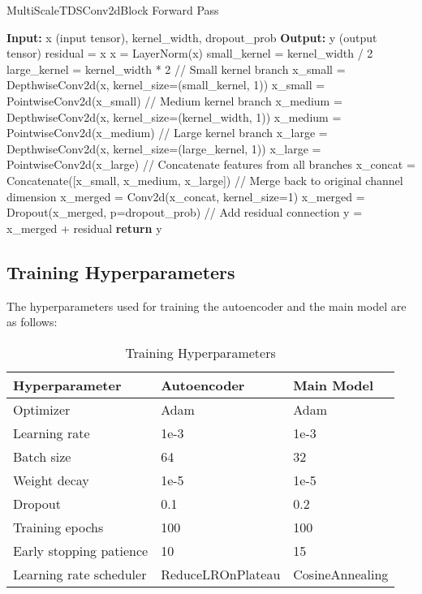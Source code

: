 \begin{algorithm}
\caption{MultiScaleTDSConv2dBlock Forward Pass}
\begin{algorithmic}[1]
\STATE \textbf{Input:} x (input tensor), kernel\_width, dropout\_prob
\STATE \textbf{Output:} y (output tensor)
\STATE residual = x
\STATE x = LayerNorm(x)
\STATE small\_kernel = kernel\_width / 2
\STATE large\_kernel = kernel\_width * 2
\STATE // Small kernel branch
\STATE x\_small = DepthwiseConv2d(x, kernel\_size=(small\_kernel, 1))
\STATE x\_small = PointwiseConv2d(x\_small)
\STATE // Medium kernel branch
\STATE x\_medium = DepthwiseConv2d(x, kernel\_size=(kernel\_width, 1))
\STATE x\_medium = PointwiseConv2d(x\_medium)
\STATE // Large kernel branch
\STATE x\_large = DepthwiseConv2d(x, kernel\_size=(large\_kernel, 1))
\STATE x\_large = PointwiseConv2d(x\_large)
\STATE // Concatenate features from all branches
\STATE x\_concat = Concatenate([x\_small, x\_medium, x\_large])
\STATE // Merge back to original channel dimension
\STATE x\_merged = Conv2d(x\_concat, kernel\_size=1)
\STATE x\_merged = Dropout(x\_merged, p=dropout\_prob)
\STATE // Add residual connection
\STATE y = x\_merged + residual
\STATE \textbf{return} y
\end{algorithmic}
\end{algorithm}

\subsection{Training Hyperparameters}

The hyperparameters used for training the autoencoder and the main model are as follows:

\begin{table}[h]
\centering
\caption{Training Hyperparameters}
\begin{tabular}{lll}
\toprule
Hyperparameter & Autoencoder & Main Model \\
\midrule
Optimizer & Adam & Adam \\
Learning rate & 1e-3 & 1e-3 \\
Batch size & 64 & 32 \\
Weight decay & 1e-5 & 1e-5 \\
Dropout & 0.1 & 0.2 \\
Training epochs & 100 & 100 \\
Early stopping patience & 10 & 15 \\
Learning rate scheduler & ReduceLROnPlateau & CosineAnnealing \\
\bottomrule
\end{tabular}
\end{table}

